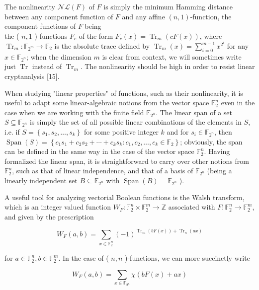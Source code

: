 \documentclass[10pt]{article}
\begin{document}
The nonlinearity $\mathcal{N} \mathcal{L}(F)$ of $F$ is simply the minimum Hamming distance between any component function of $F$ and any affine $(n, 1)$-function, the component functions of $F$ being\\
the ( $n, 1$ )-functions $F_{c}$ of the form $F_{c}(x)=\operatorname{Tr}_{m}(c F(x))$, where $\operatorname{Tr}_{m}: \mathbb{F}_{2^{m}} \rightarrow \mathbb{F}_{2}$ is the absolute trace defined by $\operatorname{Tr}_{m}(x)=\sum_{i=0}^{m-1} x^{2^{i}}$ for any $x \in \mathbb{F}_{2^{n}}$; when the dimension $m$ is clear from context, we will sometimes write just $\operatorname{Tr}$ instead of $\operatorname{Tr}_{m}$. The nonlinearity should be high in order to resist linear cryptanalysis [15].

When studying "linear properties" of functions, such as their nonlinearity, it is useful to adapt some linear-algebraic notions from the vector space $\mathbb{F}_{2}^{n}$ even in the case when we are working with the finite field $\mathbb{F}_{2^{n}}$. The linear span of a set $S \subseteq \mathbb{F}_{2^{n}}$ is simply the set of all possible linear combinations of the elements in $S$, i.e. if $S=\left\{s_{1}, s_{2}, \ldots, s_{k}\right\}$ for some positive integer $k$ and for $s_{i} \in \mathbb{F}_{2^{n}}$, then $\operatorname{Span}(S)=\left\{c_{1} s_{1}+c_{2} s_{2}+\cdots+c_{k} s_{k}:\right. \left.c_{1}, c_{2}, \ldots, c_{k} \in \mathbb{F}_{2}\right\}$; obviously, the span can be defined in the same way in the case of the vector space $\mathbb{F}_{2}^{n}$. Having formalized the linear span, it is straightforward to carry over other notions from $\mathbb{F}_{2}^{n}$, such as that of linear independence, and that of a basis of $\mathbb{F}_{2^{n}}$ (being a linearly independent set $B \subseteq \mathbb{F}_{2^{n}}$ with $\operatorname{Span}(B)=\mathbb{F}_{2^{n}}$ ).

A useful tool for analyzing vectorial Boolean functions is the Walsh transform, which is an integer valued function $W_{F}: \mathbb{F}_{2}^{n} \times \mathbb{F}_{2}^{m} \rightarrow \mathbb{Z}$ associated with $F: \mathbb{F}_{2}^{n} \rightarrow \mathbb{F}_{2}^{m}$, and given by the prescription

$$
W_{F}(a, b)=\sum_{x \in \mathbb{F}_{2}^{n}}(-1)^{\operatorname{Tr}_{m}(b F(x))+\operatorname{Tr}_{n}(a x)}
$$

for $a \in \mathbb{F}_{2}^{n}, b \in \mathbb{F}_{2}^{m}$. In the case of ( $n, n$ )-functions, we can more succinctly write

$$
W_{F}(a, b)=\sum_{x \in \mathbb{F}_{2^{n}}} \chi(b F(x)+a x)
$$
\end{document}
